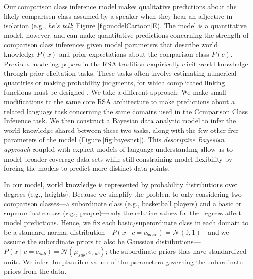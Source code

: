 \documentclass[doc]{apa6}
\begin{document}
Our comparison class inference model makes qualitative predictions about the likely comparison class assumed by a speaker when they hear an adjective in isolation (e.g., \emph{he's tall}; Figure \ref{fig:modelCartoon}E). 
The model is a quantitative model, however, and can make quantitative predictions concerning the strength of comparison class inferences given model parameters that describe world knowledge $P(x)$ and prior expectations about the comparison class $P(c)$.
Previous modeling papers in the RSA tradition empirically elicit world knowledge through prior elicitation tasks.
These tasks often involve estimating numerical quantities or making probability judgments, for which complicated linking functions must be designed \cite{Franke2016}. 
We take a different approach: We make small modifications to the same core RSA architecture to make predictions about a related language task concerning the same domains used in the Comparison Class Inference task. 
We then construct a Bayesian data analytic model to infer the world knowledge shared between these two tasks, along with the few other free parameters of the model (Figure \ref{fig:bayesnet}). 
This \emph{descriptive Bayesian approach} \cite{tauber2017} coupled with explicit models of language understanding allow us to model broader coverage data sets while still constraining model flexibility by forcing the models to predict more distinct data points. 

In our model, world knowledge is represented by probability distributions over degrees (e.g., heights).
Because we simplify the problem to only considering two comparison classes---a subordinate class (e.g., basketball players) and a basic or superordinate class (e.g., people)---only the relative values for the degrees affect model predictions. 
Hence, we fix each basic/superordinate class in each domain to be a standard normal distribution---$P(x \mid c = c_{basic}) = \mathcal{N}(0, 1)$---and we assume the subordinate priors to also be Gaussian distributions---\(P(x \mid c = c_{sub}) = \mathcal{N}(\mu_{sub}, \sigma_{sub})\); the subordinate priors thus have standardized units.
We infer the plausible values of the parameters governing the subordinate priors from the data.
\end{document}
